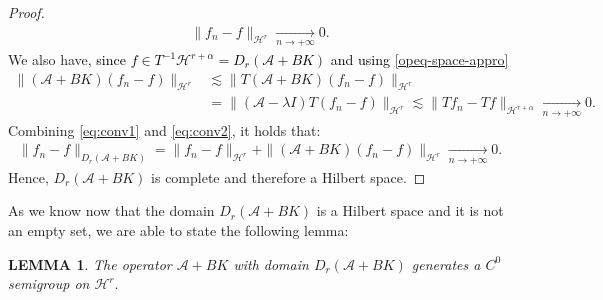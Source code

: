 \documentclass[11pt, dvipsnames]{amsart}
\newtheorem{lem}[theorem]{LEMMA}
\begin{document}
\begin{proof}
\begin{align}
    \|f_n-f\|_{\mathcal{H}^{r}}\underset{n\rightarrow+\infty}{\longrightarrow} 0.\label{eq:conv1}
\end{align}
We also have, \textcolor{black}{since $f\in T^{-1}\mathcal{H}^{r+\alpha}=D_{r}(\mathcal{A}+BK)$ and using \eqref{opeq-space-appro}}
\begin{align}
    \|(\mathcal{A}+BK)(f_n-f)\|_{\mathcal{H}^{r}}&\lesssim \|T(\mathcal{A}+BK)(f_n-f)\|_{\mathcal{H}^{r}}\nonumber\\
    &=\|(\mathcal{A}-\lambda I)T(f_n-f)\|_{\mathcal{H}^{r}}\lesssim \|T f_n-Tf\|_{\mathcal{H}^{r+\alpha}}\underset{n\rightarrow+\infty}{\longrightarrow} 0.\label{eq:conv2}
\end{align}
Combining \eqref{eq:conv1} and \eqref{eq:conv2}, it holds that:
\begin{align*}
    \|f_n-f\|_{D_r(\mathcal{A}+BK)}=\|f_n-f\|_{\mathcal{H}^{r}}+\|(\mathcal{A}+BK)(f_n-f)\|_{\mathcal{H}^{r}}\underset{n\rightarrow+\infty}{\longrightarrow} 0.
\end{align*}
Hence, $D_r(\mathcal{A}+BK)$ is complete and therefore a Hilbert space.
\end{proof}
As we know now that the domain $D_r(\mathcal{A}+BK)$ is a Hilbert space and it is not an empty set, we are able to state the following lemma:
\begin{lem}\label{Lemma-Dr-semigroup}
    The operator $\mathcal{A}+BK$ with domain $D_r(\mathcal{A}+BK)$ generates a $C^0$ semigroup on $\mathcal{H}^r.$
\end{lem}
\end{document}
